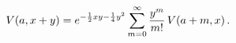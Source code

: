 \[\mathop{V\/}\nolimits\!\left(a,x+y\right)=e^{-\frac{1}{2}xy-\frac{1}{4}y^{2}}%
\sum_{m=0}^{\infty}\frac{y^{m}}{m!}\mathop{V\/}\nolimits\!\left(a+m,x\right).\]